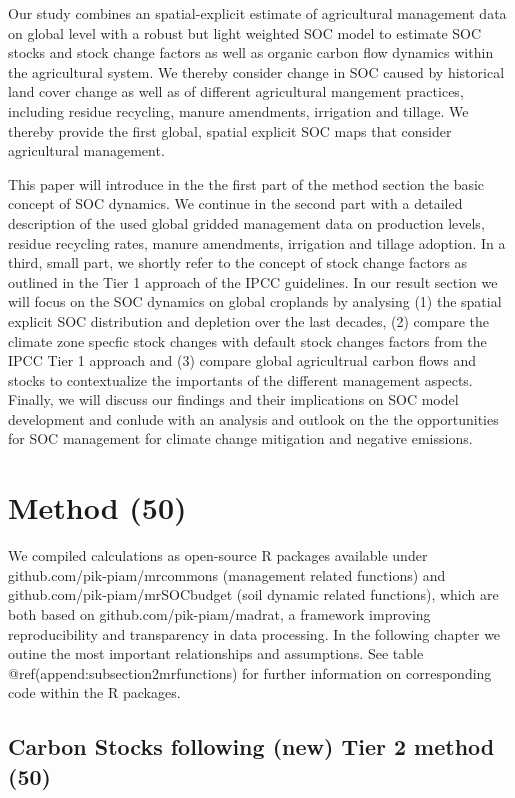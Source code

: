 \documentclass[gc, manuscript]{copernicus}
\begin{document}
Our study combines an spatial-explicit estimate of agricultural
management data on global level with a robust but light weighted SOC
model to estimate SOC stocks and stock change factors as well as organic
carbon flow dynamics within the agricultural system. We thereby consider
change in SOC caused by historical land cover change as well as of
different agricultural mangement practices, including residue recycling,
manure amendments, irrigation and tillage. We thereby provide the first
global, spatial explicit SOC maps that consider agricultural management.

This paper will introduce in the the first part of the method section
the basic concept of SOC dynamics. We continue in the second part with a
detailed description of the used global gridded management data on
production levels, residue recycling rates, manure amendments,
irrigation and tillage adoption. In a third, small part, we shortly
refer to the concept of stock change factors as outlined in the Tier 1
approach of the IPCC guidelines. In our result section we will focus on
the SOC dynamics on global croplands by analysing (1) the spatial
explicit SOC distribution and depletion over the last decades, (2)
compare the climate zone specfic stock changes with default stock
changes factors from the IPCC Tier 1 approach and (3) compare global
agricultrual carbon flows and stocks to contextualize the importants of
the different management aspects. Finally, we will discuss our findings
and their implications on SOC model development and conlude with an
analysis and outlook on the the opportunities for SOC management for
climate change mitigation and negative emissions.

\newpage

\section{Method (50)}

We compiled calculations as open-source R packages available under
github.com/pik-piam/mrcommons (management related functions) and
github.com/pik-piam/mrSOCbudget (soil dynamic related functions), which
are both based on github.com/pik-piam/madrat, a framework improving
reproducibility and transparency in data processing. In the following
chapter we outine the most important relationships and assumptions. See
table @ref(append:subsection2mrfunctions) for further information on
corresponding code within the R packages.

\hypertarget{sec:carbonbudget}{%
\subsection{Carbon Stocks following (new) Tier 2 method
(50)}\label{sec:carbonbudget}}
\end{document}
